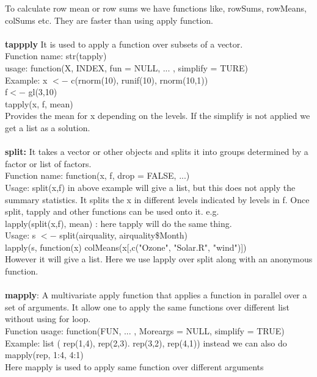 \documentclass[a4paper,oneside, 12pt]{report}
\begin{document}
To calculate row mean or row sums we have functions like, rowSums, rowMeans, colSums etc. They are faster than using apply function. 
\\
\\
{\bf tappply} It is used to apply a function over subsets of a vector. \\
Function name: str(tapply) \\
usage: function(X, INDEX, fun = NULL, ... , simplify = TURE)\\
Example: x $<-$ c(rnorm(10), runif(10), rnorm(10,1))\\
\indent f$<-$ gl(3,10)\\
\indent tapply(x, f, mean)\\ Provides the mean for x depending on the levels. If the simplify is not applied we get a list as a solution.
\\
\\
{\bf split:} It takes a vector or other objects and splits it into groups determined by a factor or list of factors. \\
Function name: function(x, f, drop = FALSE, ...)\\
Usage: split(x,f) in above example will give a list, but this does not apply the summary statistics. It splits the x in different levels indicated by levels in f. Once split, tapply and other functions can be used onto it. e.g.\\
\indent lapply(split(x,f), mean) : here tapply will do the same thing. \\
\indent Usage: s $<-$ split(airquality, airquality\$Month)\\
\indent \indent lapply(s, function(x) colMeans(x[,c("Ozone", "Solar.R", "wind")])\\
However it will give a list. Here we use lapply over split along with an anonymous function. \\ 
\\
{\bf mapply}: A multivariate apply function that applies a function in parallel over a set of arguments. It allow one to apply the same functions over different list without using for loop.\\
Function usage: function(FUN, ... , Moreargs = NULL, simplify = TRUE)\\
Example: list ( rep(1,4), rep(2,3). rep(3,2), rep(4,1)) instead we can also do\\
\indent mapply(rep, 1:4, 4:1)\\
Here mapply is used to apply same function over different arguments\\
\end{document}
